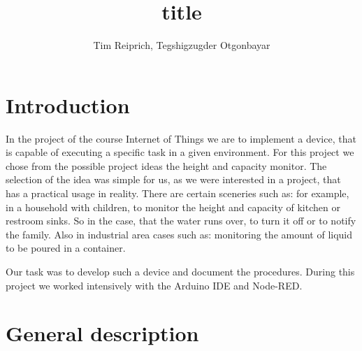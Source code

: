 \documentclass{article}
\title{title}
\author{Tim Reiprich, Tegshigzugder Otgonbayar}
\begin{document}
\pagestyle{plain}  %

\maketitle


\newpage

\tableofcontents %
\newpage


\section{Introduction}

In the project of the course Internet of Things we are to implement a device, that is capable of executing a specific task in a given environment. For this project we chose from the possible project ideas the height and capacity monitor. The selection of the idea was simple for us, as we were interested in a project, that has a practical usage in reality. There are certain sceneries such as: for example, in a household with children, to monitor the height and capacity of kitchen or restroom sinks. So in the case, that the water runs over, to turn it off or to notify the family. Also in industrial area cases such as: monitoring the amount of liquid to be poured in a container.

Our task was to develop such a device and document the procedures. During this project we worked intensively with the Arduino IDE and Node-RED.

\section{General description}
\end{document}
